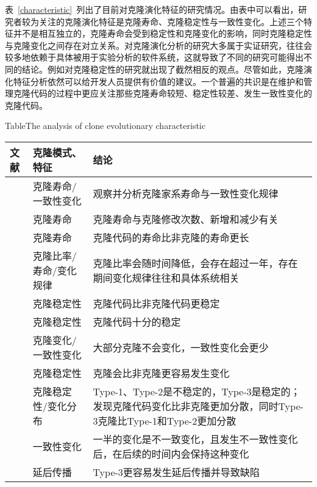 表~\ref{characteristic}~列出了目前对克隆演化特征的研究情况。由表中可以看出，研究者较为关注的克隆演化特征是克隆寿命、克隆稳定性与一致性变化。上述三个特征并不是相互独立的，克隆寿命会受到稳定性和克隆变化的影响，同时克隆稳定性与克隆变化之间存在对立关系。对克隆演化分析的研究大多属于实证研究，往往会较多地依赖于具体被用于实验分析的软件系统，这就导致了不同的研究可能得出不同的结论。例如对克隆稳定性的研究就出现了截然相反的观点。尽管如此，克隆演化特征分析依然可以给开发人员提供有价值的建议。一个普遍的共识是在维护和管理克隆代码的过程中更应关注那些克隆寿命较短、稳定性较差、发生一致性变化的克隆代码。%

\begin{table}[htbp]
\centering
{}
{Table$\!$}{The analysis of clone evolutionary characteristic}
\vspace{0.5em}
\wuhao
\begin{tabularx}{0.9\textwidth}{llX}
\toprule[1.5pt]
文献&克隆模式、特征&结论\\
\midrule[1pt]
\cite{kim2005empirical}&	克隆寿命/一致性变化	&观察并分析克隆家系寿命与一致性变化规律\\
\cite{cai2011empirical}&	克隆寿命&	克隆寿命与克隆修改次数、新增和减少有关\\
\cite{krinke2011cloned}&	克隆寿命&	克隆代码的寿命比非克隆的寿命更长\\
\cite{bazrafshan2012evolution}\cite{gode2009evolution}&	克隆比率/寿命/变化规律	&克隆比率会随时间降低，会存在超过一年，存在期间变化规律往往和具体系统相关\\
\hline
\cite{krinke2008cloned}&克隆稳定性&	克隆代码比非克隆代码更稳定\\
\cite{gode2011clone}\cite{harder2013cloned}&	克隆稳定性&	克隆代码十分的稳定\\
\cite{gode2011frequency}&	克隆变化/一致性变化&	大部分克隆不会变化，一致性变化会更少\\
\cite{rahman2014change}&	克隆稳定性&	克隆会比非克隆更容易发生变化\\
\cite{mondal2012comparative}\cite{mondal2012dispersion}&	克隆稳定性/变化分布&	Type-1、Type-2是不稳定的，Type-3是稳定的；发现克隆代码变化比非克隆更加分散，同时Type-3克隆比Type-1和Type-2更加分散\\
\hline
\cite{krinke2007study}&	一致性变化&	一半的变化是不一致变化，且发生不一致性变化后，在后续的时间内会保持这种变化\\
\cite{mondal2016comparative}&	延后传播&	Type-3更容易发生延后传播并导致缺陷\\
\bottomrule[1.5pt]
\end{tabularx}
\end{table}


